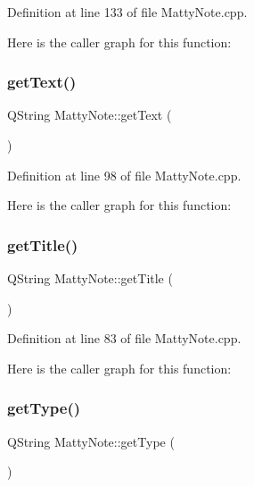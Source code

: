 Definition at line 133 of file Matty\+Note.\+cpp.

Here is the caller graph for this function\+:
\hypertarget{classMattyNote_a9213ac15a09625f59a95ede1b1470308}{}\label{classMattyNote_a9213ac15a09625f59a95ede1b1470308} 
\subsubsection{\texorpdfstring{get\+Text()}{getText()}}
{\footnotesize\ttfamily Q\+String Matty\+Note\+::get\+Text (\begin{DoxyParamCaption}{ }\end{DoxyParamCaption})}



Definition at line 98 of file Matty\+Note.\+cpp.

Here is the caller graph for this function\+:
\hypertarget{classMattyNote_acb4af77f4177a0b17f140d4b4421e32e}{}\label{classMattyNote_acb4af77f4177a0b17f140d4b4421e32e} 
\subsubsection{\texorpdfstring{get\+Title()}{getTitle()}}
{\footnotesize\ttfamily Q\+String Matty\+Note\+::get\+Title (\begin{DoxyParamCaption}{ }\end{DoxyParamCaption})}



Definition at line 83 of file Matty\+Note.\+cpp.

Here is the caller graph for this function\+:
\hypertarget{classMattyNote_ad07b65692d79cf25e5c9008e111bd999}{}\label{classMattyNote_ad07b65692d79cf25e5c9008e111bd999} 
\subsubsection{\texorpdfstring{get\+Type()}{getType()}}
{\footnotesize\ttfamily Q\+String Matty\+Note\+::get\+Type (\begin{DoxyParamCaption}{ }\end{DoxyParamCaption})}



